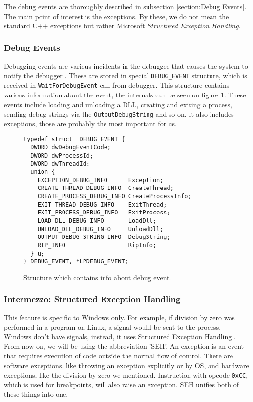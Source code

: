 The debug events are thoroughly described in subsection \ref{section:Debug Events}. The main point of interest is the exceptions.
By these, we do not mean the standard C++ exceptions but rather Microsoft \textit{Structured Exception Handling}.

\subsubsection*{Debug Events}\label{section:Debug Events}
Debugging events are various incidents in the debuggee that causes the system to notify the debugger \cite{windows-msdn-debug-events}. These are stored in special \texttt{DEBUG_EVENT} structure, which is received in \texttt{WaitForDebugEvent} call from debugger. This structure contains various information about the event, the internals can be seen on figure \ref{fig:DebugEvent}. These events include loading and unloading a DLL, creating and exiting a process, sending debug strings via the \texttt{OutputDebugString} and so on. It also includes exceptions, those are probably the most important for us. 
\begin{figure}
\begin{verbatim}
typedef struct _DEBUG_EVENT {
  DWORD dwDebugEventCode;
  DWORD dwProcessId;
  DWORD dwThreadId;
  union {
    EXCEPTION_DEBUG_INFO      Exception;
    CREATE_THREAD_DEBUG_INFO  CreateThread;
    CREATE_PROCESS_DEBUG_INFO CreateProcessInfo;
    EXIT_THREAD_DEBUG_INFO    ExitThread;
    EXIT_PROCESS_DEBUG_INFO   ExitProcess;
    LOAD_DLL_DEBUG_INFO       LoadDll;
    UNLOAD_DLL_DEBUG_INFO     UnloadDll;
    OUTPUT_DEBUG_STRING_INFO  DebugString;
    RIP_INFO                  RipInfo;
  } u;
} DEBUG_EVENT, *LPDEBUG_EVENT;
\end{verbatim}
\caption{Structure which contains info about debug event.}
\label{fig:DebugEvent}
\end{figure}

\subsubsection*{Intermezzo: Structured Exception Handling}
This feature is specific to Windows only. For example, if division by zero was performed in a program on Linux,
a signal would be sent to the process. Windows don't have signals, instead, it uses Structured Exception Handling \cite{windows-msdn-seh}. 
From now on, we will be using the abbreviation 'SEH'.
An exception is an event that requires execution of code outside the normal flow of control. There are software exceptions,
like throwing an exception explicitly or by OS, and hardware exceptions, like the division by zero we mentioned.
Instruction with opcode \texttt{0xCC}, which is used for breakpoints, will also raise an exception. SEH unifies both of these things into one.

